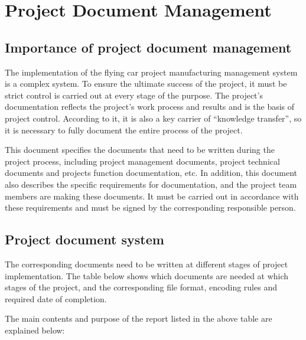 \chapter{Project Document Management}

\section{Importance of project document management}

The implementation of the flying car project manufacturing management system is a complex system. To ensure the ultimate success of the project, it must be strict control is carried out at every stage of the purpose. The project's documentation reflects the project's work process and results and is the basis of project control. According to it, it is also a key carrier of “knowledge transfer”, so it is necessary to fully document the entire process of the project.

This document specifies the documents that need to be written during the project process, including project management documents, project technical documents and projects function documentation, etc. In addition, this document also describes the specific requirements for documentation, and the project team members are making these documents. It must be carried out in accordance with these requirements and must be signed by the corresponding responsible person.

\section{Project document system}

The corresponding documents need to be written at different stages of project implementation. The table below shows which documents are needed at which stages of the project, and the corresponding file format, encoding rules and required date of completion.

{\color{red}{表格}}

The main contents and purpose of the report listed in the above table are explained below:

